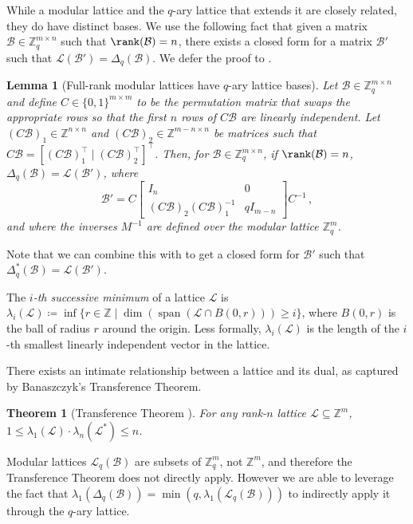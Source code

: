 \documentclass[11pt]{article}
\theoremstyle{definition}
\theoremstyle{plain}
\newtheorem{theorem}[definition]{Theorem}
\newtheorem{lemma}[definition]{Lemma}
\theoremstyle{remark}
\newcommand{\LL}{\mathcal{L}}
\newcommand{\cB}{\mathcal{B}}
\newcommand{\bZ}{\mathbb{Z}}
\begin{document}
While a modular lattice and the $q$-ary lattice that extends it are closely related, they do have distinct bases. We use the following fact that given a matrix $\mathcal{B} \in\bZ_q^{m\times n}$ such that $\rank(\mathcal{B}) = n$, there exists a closed form for a matrix $\mathcal{B}'$ such that $\LL(\mathcal{B}')= \Delta_q(\mathcal{B})$. We defer the proof to .
\begin{lemma}[Full-rank modular lattices have $q$-ary lattice bases]\label{lem:q-basis}
    Let $\cB \in \bZ_{q}^{m \times n}$ and define $C \in \{0,1\}^{m \times m}$ to be the permutation matrix that swaps the appropriate rows so that the first $n$ rows of $C\cB$ are linearly independent. Let $(C\cB)_1 \in \bZ^{n \times n}$ and $(C\cB)_2 \in \bZ^{m - n \times n}$ be matrices such that \mbox{$C\cB = [(C\cB)_1^\intercal \mid (C\cB)_2^\intercal]^\intercal$}. Then, for $\cB \in \bZ_q^{m \times n}$, if $\rank(\cB) = n$, $\Delta_q(\cB) = \LL(\cB')$, where
    \[ \cB' = 
    C
    \begin{bmatrix}
    I_n & 0\\
    (C\cB)_2(C\cB)_1^{-1} & qI_{m-n} 
    \end{bmatrix}
    C^{-1}
    \,, \]
    and where the inverses $M^{-1}$ are defined over the modular lattice $\bZ_q^m$.
\end{lemma}



Note that we can combine this with  to get a closed form for $\mathcal{B}'$ such that $\Delta_q^*(\mathcal{B}) = \LL(\mathcal{B}')$.

The \emph{$i$-th successive minimum} of a lattice $\LL$ is $\lambda_i(\mathcal{L}) \coloneqq \inf \{ r \in \mathbb{Z} \mid \dim (\operatorname{span} (\mathcal{L} \cap B(0, r))) \geq i \}$, where $B(0,r)$ is the ball of radius $r$ around the origin. Less formally,  $\lambda_i(\LL)$ is the length of the $i$-th smallest linearly independent vector in the lattice.

There exists an intimate relationship between a lattice and its dual, as captured by Banaszczyk's Transference Theorem.
\begin{theorem}[Transference Theorem \cite{banaszczyk1993new}]
\label{thm:transference}
 For any rank-$n$ lattice $\mathcal{L} \subseteq \bZ^m$, $1\leq\lambda_1(\mathcal{L})\cdot\lambda_n(\mathcal{L}^*)\leq n$.
\end{theorem}

Modular lattices $\LL_q(\mathcal{B})$ are subsets of $\bZ_q^m$, not $\bZ^m$, and therefore the Transference Theorem does not directly apply. However we are able to leverage the fact that 
 $\lambda_1(\Delta_q(\mathcal{B})) = \min(q, \lambda_1(\LL_q(\mathcal{B})))$ to indirectly apply it through the $q$-ary lattice.
\end{document}
